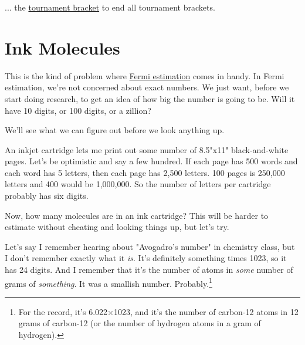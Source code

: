 {{... the \href{https://en.wikipedia.org/wiki/Bracket\_(tournament)}{tournament bracket} to end all tournament brackets.}

{
\chapter{Ink Molecules}
}

\hfill{}

{This is the kind of problem where \href{http://what-if.xkcd.com/84/}{Fermi estimation} comes in handy. In Fermi estimation, we're not concerned about exact numbers. We just want, before we start doing research, to get an idea of how big the number is going to be. Will it have 10 digits, or 100 digits, or a zillion?}

{We'll see what we can figure out before we look anything up.}

{An inkjet cartridge lets me print out some number of 8.5"x11" black-and-white pages. Let's be optimistic and say a few hundred. If each page has 500 words and each word has 5 letters, then each page has 2,500 letters. 100 pages is 250,000 letters and 400 would be 1,000,000. So the number of letters per cartridge probably has six digits.}

{Now, how many molecules are in an ink cartridge? This will be harder to estimate without cheating and looking things up, but let's try.}

{Let's say I remember hearing about "Avogadro's number" in chemistry class, but I don't remember exactly what it \emph{is}. It's definitely something times 1023, so it has 24 digits. And I remember that it's the number of atoms in \emph{some} number of grams of \emph{something}. It was a smallish number. Probably.{\footnote{For the record, it's 6.022×1023, and it's the number of carbon-12 atoms in 12 grams of carbon-12 (or the number of hydrogen atoms in a gram of hydrogen).} } }

}
